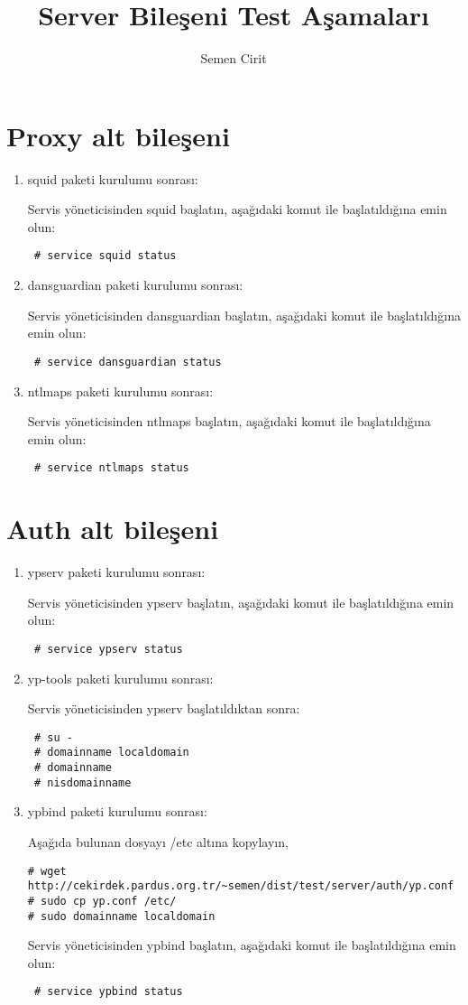 \documentclass[a4paper,10pt]{article}
\title{Server Bileşeni Test Aşamaları}
\author{Semen Cirit}
\begin{document}
\section{Proxy alt bileşeni}
\begin{enumerate}
\item squid paketi kurulumu sonrası:

Servis yöneticisinden squid başlatın, aşağıdaki komut ile başlatıldığına emin olun:
\begin{verbatim}
 # service squid status
\end{verbatim}
 \item dansguardian paketi kurulumu sonrası:

Servis yöneticisinden dansguardian başlatın, aşağıdaki komut ile başlatıldığına emin olun:
\begin{verbatim}
 # service dansguardian status
\end{verbatim}
\item ntlmaps paketi kurulumu sonrası:

Servis yöneticisinden ntlmaps başlatın, aşağıdaki komut ile başlatıldığına emin olun:
\begin{verbatim}
 # service ntlmaps status
\end{verbatim}
\end{enumerate}


\section{Auth alt bileşeni}
\begin{enumerate}
 \item ypserv paketi kurulumu sonrası:

Servis yöneticisinden ypserv başlatın, aşağıdaki komut ile başlatıldığına emin olun:
\begin{verbatim}
 # service ypserv status
\end{verbatim}

\item yp-tools paketi kurulumu sonrası:

Servis yöneticisinden ypserv başlatıldıktan sonra:
\begin{verbatim}
 # su -
 # domainname localdomain
 # domainname
 # nisdomainname
\end{verbatim}

\item ypbind paketi kurulumu sonrası:

Aşağıda bulunan dosyayı /etc altına kopylayın,
\begin{verbatim}
# wget http://cekirdek.pardus.org.tr/~semen/dist/test/server/auth/yp.conf 
# sudo cp yp.conf /etc/
# sudo domainname localdomain
\end{verbatim}

Servis yöneticisinden ypbind başlatın, aşağıdaki komut ile başlatıldığına emin olun:
\begin{verbatim}
 # service ypbind status
\end{verbatim}

\end{enumerate}
\end{document}
